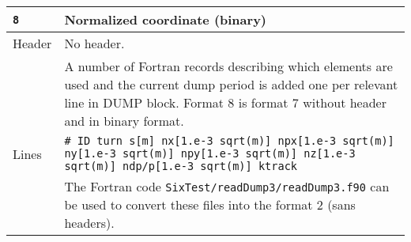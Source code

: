 \begin{center}
\begin{longtable}{|p{1.8cm}|p{13.8cm}|}
            \rowcolor{blue!15}
	    \texttt{8} & Normalized coordinate (binary)\\
            \hline
            Header  & No header.\vspace{1mm} \\
                    & A number of Fortran records describing which elements are used and the current dump period is added one per relevant line in DUMP block. Format 8 is format 7 without header and in binary format.\\
            \hline
            Lines   & \texttt{\# ID turn s[m] nx[1.e-3 sqrt(m)] npx[1.e-3 sqrt(m)] ny[1.e-3 sqrt(m)] npy[1.e-3 sqrt(m)] nz[1.e-3 sqrt(m)] ndp/p[1.e-3 sqrt(m)] ktrack}\vspace{1mm} \\
                    & The Fortran code \texttt{SixTest/readDump3/readDump3.f90} can be used to convert these files into the format 2 (sans headers). \\
            \hline


\end{longtable}
\end{center}
